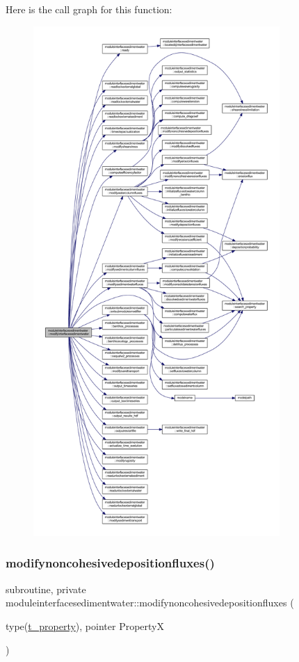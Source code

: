 Here is the call graph for this function\+:\nopagebreak
\begin{figure}[H]
\begin{center}
\leavevmode
\includegraphics[height=550pt]{namespacemoduleinterfacesedimentwater_ac36014e82a94f1ba694775e21f24b005_cgraph}
\end{center}
\end{figure}
\mbox{\label{namespacemoduleinterfacesedimentwater_a9d8d2c2895ffd32b4cc15bfff20e9f7f}} 
\subsubsection{\texorpdfstring{modifynoncohesivedepositionfluxes()}{modifynoncohesivedepositionfluxes()}}
{\footnotesize\ttfamily subroutine, private moduleinterfacesedimentwater\+::modifynoncohesivedepositionfluxes (\begin{DoxyParamCaption}\item[{type(\mbox{\hyperlink{structmoduleinterfacesedimentwater_1_1t__property}{t\+\_\+property}}), pointer}]{PropertyX }\end{DoxyParamCaption})\hspace{0.3cm}{\ttfamily [private]}}

